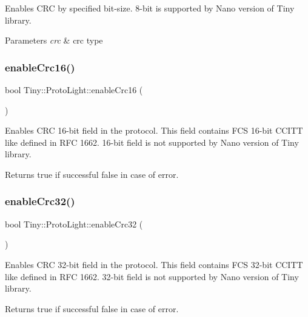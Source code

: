 Enables C\+RC by specified bit-\/size. 8-\/bit is supported by Nano version of Tiny library. 
\begin{DoxyParams}{Parameters}
{\em crc} & crc type \\
\hline
\end{DoxyParams}
\mbox{\label{classTiny_1_1ProtoLight_a110b654e476691518790edcc5bf1bd80}} 
\subsubsection{\texorpdfstring{enable\+Crc16()}{enableCrc16()}}
{\footnotesize\ttfamily bool Tiny\+::\+Proto\+Light\+::enable\+Crc16 (\begin{DoxyParamCaption}{ }\end{DoxyParamCaption})}

Enables C\+RC 16-\/bit field in the protocol. This field contains F\+CS 16-\/bit C\+C\+I\+TT like defined in R\+FC 1662. 16-\/bit field is not supported by Nano version of Tiny library. \begin{DoxyReturn}{Returns}
true if successful false in case of error. 
\end{DoxyReturn}
\mbox{\label{classTiny_1_1ProtoLight_a8ae8a3ace46234a65f83c564dc56fd26}} 
\subsubsection{\texorpdfstring{enable\+Crc32()}{enableCrc32()}}
{\footnotesize\ttfamily bool Tiny\+::\+Proto\+Light\+::enable\+Crc32 (\begin{DoxyParamCaption}{ }\end{DoxyParamCaption})}

Enables C\+RC 32-\/bit field in the protocol. This field contains F\+CS 32-\/bit C\+C\+I\+TT like defined in R\+FC 1662. 32-\/bit field is not supported by Nano version of Tiny library. \begin{DoxyReturn}{Returns}
true if successful false in case of error. 
\end{DoxyReturn}
\mbox{\label{classTiny_1_1ProtoLight_a948b2a0e37177b7434581adc64b36497}} 
